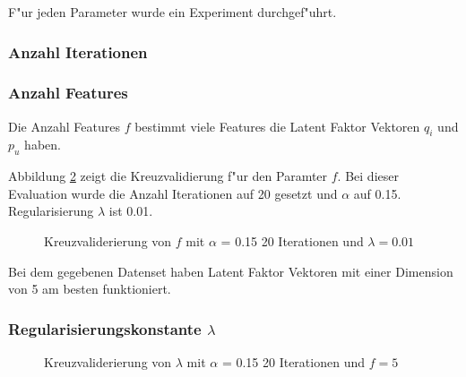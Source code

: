 \documentclass[a4paper, 12pt]{article}
\begin{document}
F"ur jeden Parameter wurde ein Experiment durchgef"uhrt.

\subsubsection{Anzahl Iterationen}

\begin{figure}
  \centering
{}

\end{figure}


\subsubsection{Anzahl Features}

Die Anzahl Features $f$ bestimmt viele Features die Latent Faktor Vektoren $q_i$ und $p_u$ haben.

Abbildung \ref{fig:lambda} zeigt die Kreuzvalidierung f"ur den Paramter $f$. Bei dieser Evaluation wurde die Anzahl Iterationen auf 20 gesetzt und $\alpha$ auf 0.15. Regularisierung $\lambda$ ist 0.01.

\begin{figure}
  \centering
{}
\label{fig:lambda}
\caption{Kreuzvaliderierung von $f$ mit $\alpha$ = 0.15 20 Iterationen und $\lambda=0.01$}
\end{figure}

Bei dem gegebenen Datenset haben Latent Faktor Vektoren mit einer Dimension von 5 am besten funktioniert.

\subsubsection{Regularisierungskonstante $\lambda$}

\begin{figure}
  \centering
{}
\label{fig:lambda}
\caption{Kreuzvaliderierung von $\lambda$ mit $\alpha$ = 0.15 20 Iterationen und $f = 5$}
\end{figure}
\end{document}
